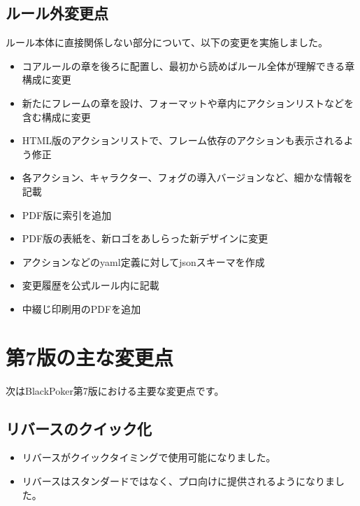 \documentclass[letterpaper,10pt,dvipdfmx]{sphinxmanual}
\begin{document}
\subsection{ルール外変更点}
\label{\detokenize{revision-history/8th:id7}}
\sphinxAtStartPar
ルール本体に直接関係しない部分について、以下の変更を実施しました。
\begin{itemize}
\item {} 
\sphinxAtStartPar
コアルールの章を後ろに配置し、最初から読めばルール全体が理解できる章構成に変更

\item {} 
\sphinxAtStartPar
新たにフレームの章を設け、フォーマットや章内にアクションリストなどを含む構成に変更

\item {} 
\sphinxAtStartPar
HTML版のアクションリストで、フレーム依存のアクションも表示されるよう修正

\item {} 
\sphinxAtStartPar
各アクション、キャラクター、フォグの導入バージョンなど、細かな情報を記載

\item {} 
\sphinxAtStartPar
PDF版に索引を追加

\item {} 
\sphinxAtStartPar
PDF版の表紙を、新ロゴをあしらった新デザインに変更

\item {} 
\sphinxAtStartPar
アクションなどのyaml定義に対してjsonスキーマを作成

\item {} 
\sphinxAtStartPar
変更履歴を公式ルール内に記載

\item {} 
\sphinxAtStartPar
中綴じ印刷用のPDFを追加

\end{itemize}

\sphinxstepscope


\section{第7版の主な変更点}
\label{\detokenize{revision-history/7th:id1}}\label{\detokenize{revision-history/7th::doc}}
\sphinxAtStartPar
次はBlackPoker第7版における主要な変更点です。


\subsection{リバースのクイック化}
\label{\detokenize{revision-history/7th:id2}}\begin{itemize}
\item {} 
\sphinxAtStartPar
リバースがクイックタイミングで使用可能になりました。

\item {} 
\sphinxAtStartPar
リバースはスタンダードではなく、プロ向けに提供されるようになりました。

\end{itemize}
\end{document}
